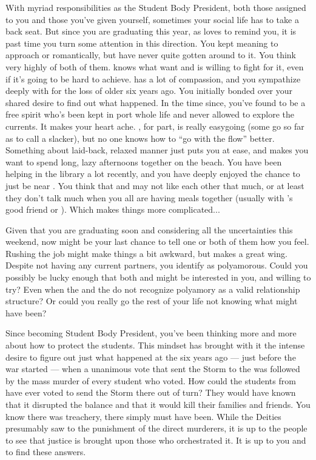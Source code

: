 \documentclass[char]{GL2020}
\begin{document}
With myriad responsibilities as the Student Body President, both those assigned to you and those you’ve given yourself, sometimes your social life has to take a back seat. But since you are graduating this year, as \cInitiate{} loves to remind you, it is past time you turn some attention in this direction. You kept meaning to approach \cHeir{\full} or \cChupStudent{\full} romantically, but have never quite gotten around to it. You think very highly of both of them. \cHeir{} knows what \cHeir{\they} want\cHeir{\verbs} and is willing to fight for it, even if it's going to be hard to achieve. \cHeir{} has a lot of compassion, and you sympathize deeply with \cHeir{\them} for the loss of \cHeir{\their} older \cHeirSibling{\sibling} six years ago. You initially bonded over your shared desire to find out what happened. In the time since, you’ve found \cHeir{} to be a free spirit who’s been kept in port \cHeir{\their} whole life and never allowed to explore the currents. It makes your heart ache. \cChupStudent{}, for \cChupStudent{\their} part, is really easygoing (some go so far as to call \cChupStudent{\them} a slacker), but no one knows how to ``go with the flow'' better. Something about \cChupStudent{\their} laid-back, relaxed manner just puts you at ease, and makes you want to spend long, lazy afternoons together on the beach. You have been helping \cChupStudent{} in the library a lot recently, and you have deeply enjoyed the chance to just be near \cChupStudent{\them}. You think that \cHeir{} and \cChupStudent{} may not like each other that much, or at least they don’t talk much when you all are having meals together (usually with \cHeir{}’s good friend \cAmbition{\full} or \cInitiate{}). Which makes things more complicated...

Given that you are graduating soon and considering all the uncertainties this weekend, now might be your last chance to tell one or both of them how you feel. Rushing the job might make things a bit awkward, but \cInitiate{} makes a great wing\cInitiate{\person}. Despite not having any current partners, you identify as polyamorous. Could you possibly be lucky enough that both \cHeir{} and \cChupStudent{} might be interested in you, and willing to try? Even when the \pFarm{} and the \pTech{} do not recognize polyamory as a valid relationship structure? Or could you really go the rest of your life not knowing what might have been?

Since becoming Student Body President, you've been thinking more and more about how to protect the students. This mindset has brought with it the intense desire to figure out just what happened at the \pSc{} six years ago — just before the war started — when a unanimous vote that sent the Storm to the \pShip{} was followed by the mass murder of every student who voted. How could the students from \pShip{} have ever voted to send the Storm there out of turn? They would have known that it disrupted the balance and that it would kill their families and friends. You know there was treachery, there simply must have been. While the Deities presumably saw to the punishment of the direct murderers, it is up to the people to see that justice is brought upon those who orchestrated it. It is up to you and \cHeir{} to find these answers. 
\end{document}
